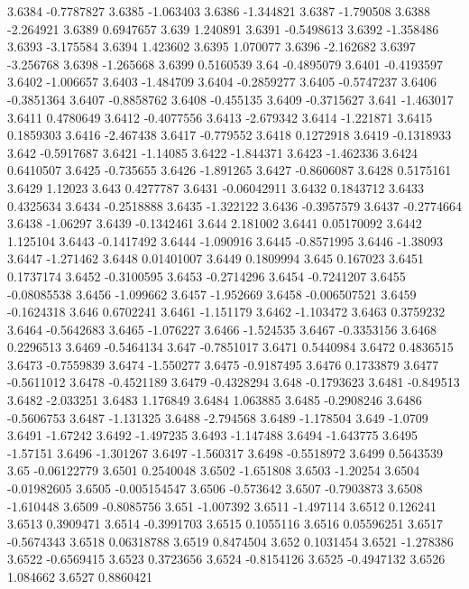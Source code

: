 3.6384  -0.7787827
3.6385  -1.063403
3.6386  -1.344821
3.6387  -1.790508
3.6388  -2.264921
3.6389  0.6947657
3.639  1.240891
3.6391  -0.5498613
3.6392  -1.358486
3.6393  -3.175584
3.6394  1.423602
3.6395  1.070077
3.6396  -2.162682
3.6397  -3.256768
3.6398  -1.265668
3.6399  0.5160539
3.64  -0.4895079
3.6401  -0.4193597
3.6402  -1.006657
3.6403  -1.484709
3.6404  -0.2859277
3.6405  -0.5747237
3.6406  -0.3851364
3.6407  -0.8858762
3.6408  -0.455135
3.6409  -0.3715627
3.641  -1.463017
3.6411  0.4780649
3.6412  -0.4077556
3.6413  -2.679342
3.6414  -1.221871
3.6415  0.1859303
3.6416  -2.467438
3.6417  -0.779552
3.6418  0.1272918
3.6419  -0.1318933
3.642  -0.5917687
3.6421  -1.14085
3.6422  -1.844371
3.6423  -1.462336
3.6424  0.6410507
3.6425  -0.735655
3.6426  -1.891265
3.6427  -0.8606087
3.6428  0.5175161
3.6429  1.12023
3.643  0.4277787
3.6431  -0.06042911
3.6432  0.1843712
3.6433  0.4325634
3.6434  -0.2518888
3.6435  -1.322122
3.6436  -0.3957579
3.6437  -0.2774664
3.6438  -1.06297
3.6439  -0.1342461
3.644  2.181002
3.6441  0.05170092
3.6442  1.125104
3.6443  -0.1417492
3.6444  -1.090916
3.6445  -0.8571995
3.6446  -1.38093
3.6447  -1.271462
3.6448  0.01401007
3.6449  0.1809994
3.645  0.167023
3.6451  0.1737174
3.6452  -0.3100595
3.6453  -0.2714296
3.6454  -0.7241207
3.6455  -0.08085538
3.6456  -1.099662
3.6457  -1.952669
3.6458  -0.006507521
3.6459  -0.1624318
3.646  0.6702241
3.6461  -1.151179
3.6462  -1.103472
3.6463  0.3759232
3.6464  -0.5642683
3.6465  -1.076227
3.6466  -1.524535
3.6467  -0.3353156
3.6468  0.2296513
3.6469  -0.5464134
3.647  -0.7851017
3.6471  0.5440984
3.6472  0.4836515
3.6473  -0.7559839
3.6474  -1.550277
3.6475  -0.9187495
3.6476  0.1733879
3.6477  -0.5611012
3.6478  -0.4521189
3.6479  -0.4328294
3.648  -0.1793623
3.6481  -0.849513
3.6482  -2.033251
3.6483  1.176849
3.6484  1.063885
3.6485  -0.2908246
3.6486  -0.5606753
3.6487  -1.131325
3.6488  -2.794568
3.6489  -1.178504
3.649  -1.0709
3.6491  -1.67242
3.6492  -1.497235
3.6493  -1.147488
3.6494  -1.643775
3.6495  -1.57151
3.6496  -1.301267
3.6497  -1.560317
3.6498  -0.5518972
3.6499  0.5643539
3.65  -0.06122779
3.6501  0.2540048
3.6502  -1.651808
3.6503  -1.20254
3.6504  -0.01982605
3.6505  -0.005154547
3.6506  -0.573642
3.6507  -0.7903873
3.6508  -1.610448
3.6509  -0.8085756
3.651  -1.007392
3.6511  -1.497114
3.6512  0.126241
3.6513  0.3909471
3.6514  -0.3991703
3.6515  0.1055116
3.6516  0.05596251
3.6517  -0.5674343
3.6518  0.06318788
3.6519  0.8474504
3.652  0.1031454
3.6521  -1.278386
3.6522  -0.6569415
3.6523  0.3723656
3.6524  -0.8154126
3.6525  -0.4947132
3.6526  1.084662
3.6527  0.8860421

